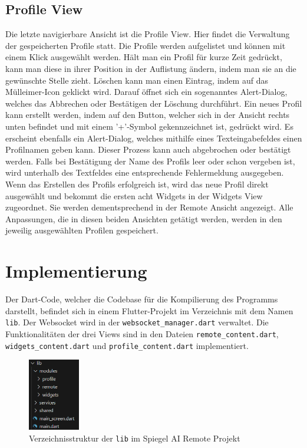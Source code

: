 \subsection{Profile View}
Die letzte navigierbare Ansicht ist die Profile View. Hier findet die Verwaltung der gespeicherten Profile statt. Die Profile werden aufgelistet und können mit einem Klick ausgewählt werden. Hält man ein Profil für kurze Zeit gedrückt, kann man diese in ihrer Position in der Auflistung ändern, indem man sie an die gewünschte Stelle zieht. Löschen kann man einen Eintrag, indem auf das Mülleimer-Icon geklickt wird. Darauf öffnet sich ein sogenanntes Alert-Dialog, welches das Abbrechen oder Bestätigen der Löschung durchführt. Ein neues Profil kann erstellt werden, indem auf den Button, welcher sich in der Ansicht rechts unten befindet und mit einem '+'-Symbol gekennzeichnet ist, gedrückt wird. Es erscheint ebenfalls ein Alert-Dialog, welches mithilfe eines Texteingabefeldes einen Profilnamen geben kann. Dieser Prozess kann auch abgebrochen oder bestätigt werden. Falls bei Bestätigung der Name des Profils leer oder schon vergeben ist, wird unterhalb des Textfeldes eine entsprechende Fehlermeldung ausgegeben. Wenn das Erstellen des Profils erfolgreich ist, wird das neue Profil direkt ausgewählt und bekommt die ersten acht Widgets in der Widgets View zugeordnet. Sie werden dementsprechend in der Remote Ansicht angezeigt. Alle Anpassungen, die in diesen beiden Ansichten getätigt werden, werden in den jeweilig ausgewählten Profilen gespeichert.

\section{Implementierung}
\sloppy
Der Dart-Code, welcher die Codebase für die Kompilierung des Programms darstellt, befindet sich in einem Flutter-Projekt im Verzeichnis mit dem Namen \texttt{lib}. Der Websocket wird in der \texttt{websocket\_manager.dart} verwaltet. Die Funktionalitäten der drei Views sind in den Dateien \texttt{remote\_content.dart}, \texttt{widgets\_content.dart} und \texttt{profile\_content.dart} implementiert.
\begin{figure}[h]
    \centering
    \includegraphics[width=0.2\textwidth]{pictures/flutter_directories.png}
    \captionsetup{justification=centering, labelformat=simple, singlelinecheck=false}
    \caption{Verzeichnisstruktur der \texttt{lib} im Spiegel AI Remote Projekt}
    \label{fig:flutter_directories}
\end{figure}

